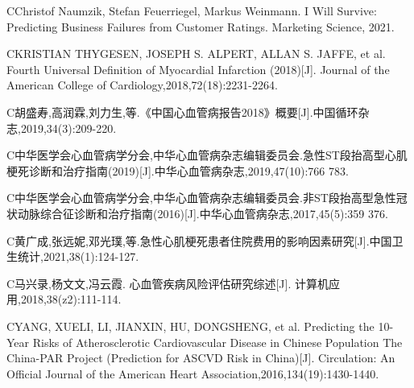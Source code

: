 \documentclass{article}
\begin{document}
\newpage


\begin{thebibliography}{99}
\bibitem CChristof Naumzik, Stefan Feuerriegel, Markus Weinmann. I Will Survive: Predicting Business Failures from Customer Ratings. Marketing Science, 2021.

\bibitem  
CKRISTIAN THYGESEN, JOSEPH S. ALPERT, ALLAN S. JAFFE, et al. Fourth Universal Definition of Myocardial Infarction (2018)[J].  Journal of the American College of Cardiology,2018,72(18):2231-2264.

\bibitem C胡盛寿,高润霖,刘力生,等.《中国心血管病报告2018》概要[J].中国循环杂志,2019,34(3):209-220.

\bibitem C中华医学会心血管病学分会,中华心血管病杂志编辑委员会.急性ST段抬高型心肌梗死诊断和治疗指南(2019)[J].中华心血管病杂志,2019,47(10):766 783.

\bibitem
C中华医学会心血管病学分会,中华心血管病杂志编辑委员会.非ST段抬高型急性冠状动脉综合征诊断和治疗指南(2016)[J].中华心血管病杂志,2017,45(5):359 376.

\bibitem C黄广成,张远妮,邓光璞,等.急性心肌梗死患者住院费用的影响因素研究[J].中国卫生统计,2021,38(1):124-127.

\bibitem C马兴录,杨文文,冯云霞. 心血管疾病风险评估研究综述[J]. 计算机应用,2018,38(z2):111-114.

\bibitem 
CYANG, XUELI, LI, JIANXIN, HU, DONGSHENG, et al. Predicting the 10-Year Risks of Atherosclerotic Cardiovascular Disease in Chinese Population The China-PAR Project (Prediction for ASCVD Risk in China)[J].  Circulation: An Official Journal of the American Heart Association,2016,134(19):1430-1440. 

\end{thebibliography}
\end{document}
